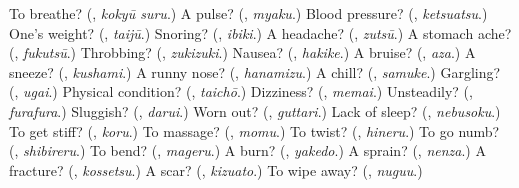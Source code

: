 \begin{tcolorbox}[breakable,colback=teal!4,colframe=teal!35!black,title={Before you move on}]
To breathe? (\textbf{}, \emph{kokyū suru}.) A pulse? (\textbf{}, \emph{myaku}.) Blood pressure? (\textbf{}, \emph{ketsuatsu}.) One's weight? (\textbf{}, \emph{taijū}.) Snoring? (\textbf{}, \emph{ibiki}.) A headache? (\textbf{}, \emph{zutsū}.) A stomach ache? (\textbf{}, \emph{fukutsū}.) Throbbing? (\textbf{}, \emph{zukizuki}.) Nausea? (\textbf{}, \emph{hakike}.) A bruise? (\textbf{}, \emph{aza}.) A sneeze? (\textbf{}, \emph{kushami}.) A runny nose? (\textbf{}, \emph{hanamizu}.) A chill? (\textbf{}, \emph{samuke}.) Gargling? (\textbf{}, \emph{ugai}.) Physical condition? (\textbf{}, \emph{taichō}.) Dizziness? (\textbf{}, \emph{memai}.) Unsteadily? (\textbf{}, \emph{furafura}.) Sluggish? (\textbf{}, \emph{darui}.) Worn out? (\textbf{}, \emph{guttari}.) Lack of sleep? (\textbf{}, \emph{nebusoku}.) To get stiff? (\textbf{}, \emph{koru}.) To massage? (\textbf{}, \emph{momu}.) To twist? (\textbf{}, \emph{hineru}.) To go numb? (\textbf{}, \emph{shibireru}.) To bend? (\textbf{}, \emph{mageru}.) A burn? (\textbf{}, \emph{yakedo}.) A sprain? (\textbf{}, \emph{nenza}.) A fracture? (\textbf{}, \emph{kossetsu}.) A scar? (\textbf{}, \emph{kizuato}.) To wipe away? (\textbf{}, \emph{nuguu}.)
\end{tcolorbox}
